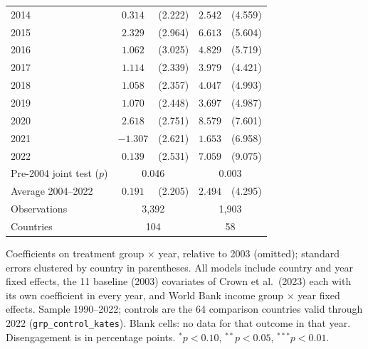 \begin{table}[htbp]
\begin{tabular}{lcccc}
2014 & $0.314$ & (2.222) & $2.542$ & (4.559) \\
2015 & $2.329$ & (2.964) & $6.613$ & (5.604) \\
2016 & $1.062$ & (3.025) & $4.829$ & (5.719) \\
2017 & $1.114$ & (2.339) & $3.979$ & (4.421) \\
2018 & $1.058$ & (2.357) & $4.047$ & (4.993) \\
2019 & $1.070$ & (2.448) & $3.697$ & (4.987) \\
2020 & $2.618$ & (2.751) & $8.579$ & (7.601) \\
2021 & $-1.307$ & (2.621) & $1.653$ & (6.958) \\
2022 & $0.139$ & (2.531) & $7.059$ & (9.075) \\
\midrule
Pre-2004 joint test ($p$) & \multicolumn{2}{c}{0.046} & \multicolumn{2}{c}{0.003} \\
Average 2004--2022 & $0.191$ & (2.205) & $2.494$ & (4.295) \\
Observations & \multicolumn{2}{c}{3,392} & \multicolumn{2}{c}{1,903} \\
Countries & \multicolumn{2}{c}{104} & \multicolumn{2}{c}{58} \\
\bottomrule
\end{tabular}
\par\vspace{4pt}
\begin{minipage}{\textwidth}\footnotesize Coefficients on treatment group $\times$ year, relative to 2003 (omitted); standard errors clustered by country in parentheses. All models include country and year fixed effects, the 11 baseline (2003) covariates of Crown et al.\ (2023) each with its own coefficient in every year, and World Bank income group $\times$ year fixed effects. Sample 1990--2022; controls are the 64 comparison countries valid through 2022 (\texttt{grp\_control\_kates}). Blank cells: no data for that outcome in that year. Disengagement is in percentage points. $^{*}p<0.10$, $^{**}p<0.05$, $^{***}p<0.01$.\end{minipage}
\end{table}
